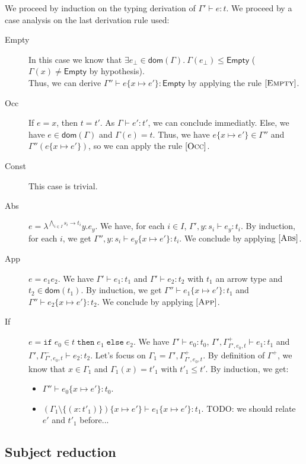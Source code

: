 \documentclass[a4paper]{article}%
\newcommand{\dom}[1]{\textsf{dom}(#1)}
\newcommand{\Empty} {\textsf{Empty}}%
\newcommand{\ite}[4]{\ensuremath{\texttt{if}\;#1\in#2\;\texttt{then}\;#3\;\texttt{else}\;#4}}
\theoremstyle{definition}
\newcommand {\Rule}[1] {[\textsc{#1}]}
\begin{document}
    We proceed by induction on the typing derivation of $\Gamma' \vdash e:t$. We proceed by a case analysis on the last derivation rule used:
    \begin{description}
      \item[Empty] In this case we know that $\exists e_{\bot} \in \dom\Gamma.\ \Gamma(e_{\bot}) \leq \Empty$ ($\Gamma(x) \neq \Empty$ by hypothesis).\\
      Thus, we can derive $\Gamma'' \vdash e\{x\mapsto e'\}:\Empty$ by applying the rule $\Rule {Empty}$.
      \item[Occ] If $e=x$, then $t=t'$. As $\Gamma \vdash e':t'$, we can conclude immediatly. Else, we have $e \in \dom \Gamma$ and $\Gamma(e) = t$.
      Thus, we have $e\{x\mapsto e'\} \in \Gamma''$ and $\Gamma''(e\{x\mapsto e'\})$, so we can apply the rule $\Rule {Occ}$.
      \item[Const] This case is trivial.
      \item[Abs] $e=\lambda^{\bigwedge_{i\in I} s_i \rightarrow t_i}y.e_y$. We have, for each $i \in I$, $\Gamma',y:s_i \vdash e_y:t_i$.
      By induction, for each $i$, we get  $\Gamma'',y:s_i \vdash e_y\{x\mapsto e'\}:t_i$. We conclude by applying $\Rule {Abs}$.
      \item[App] $e=e_1 e_2$. We have $\Gamma'\vdash e_1:t_1$ and $\Gamma'\vdash e_2:t_2$ with $t_1$ an arrow type and $t_2 \in \dom {t_1}$.
      By induction, we get $\Gamma''\vdash e_1\{x\mapsto e'\}:t_1$ and $\Gamma''\vdash e_2\{x\mapsto e'\}:t_2$. We conclude by applying $\Rule {App}$.
      \item[If] $e=\ite {e_0} t {e_1}{e_2}$. We have $\Gamma' \vdash e_0:t_0$, $\Gamma',\Gamma^+_{\Gamma',e_0,t}\vdash e_1 : t_1$ and $\Gamma',\Gamma^-_{\Gamma',e_0,t}\vdash e_2 : t_2$.
      Let's focus on $\Gamma_1=\Gamma',\Gamma^+_{\Gamma',e_0,t}$. By definition of $\Gamma^+$, we know that $x \in \Gamma_1$ and $\Gamma_1(x)=t'_1$ with $t'_1 \leq t'$.
      By induction, we get:
      \begin{itemize}
        \item $\Gamma'' \vdash e_0\{x\mapsto e'\}:t_0$.
        \item $(\Gamma_1\setminus\{(x:t'_1)\})\{x\mapsto e'\}\vdash e_1\{x\mapsto e'\} : t_1$. TODO: we should relate $e'$ and $t'_1$ before...
      \end{itemize}
    \end{description}

    \subsection{Subject reduction}
\end{document}
